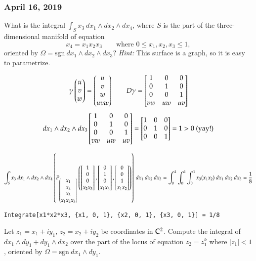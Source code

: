\subsubsection*{April 16, 2019}

What is the integral $\int_S x_3\ dx_1\land dx_2\land dx_4$, where $S$ is the part of the three-dimensional manifold of equation
\[x_4 = x_1x_2x_3\qquad \text{where }0\leq x_1, x_2, x_3\leq 1,\]
oriented by $\Omega = \mathrm{sgn}\ dx_1\land dx_2\land dx_3$? \emph{Hint: }This surface is a graph, so it is easy to parametrize. 

\[\gamma\begin{pmatrix} u \\ v \\ w \end{pmatrix} = \begin{pmatrix} u \\ v \\ w \\ uvw \end{pmatrix}\qquad D\gamma = \begin{bmatrix} 1 & 0 & 0 \\ 0 & 1 & 0 \\ 0 & 0 & 1 \\ vw & uw & uv \end{bmatrix}\]
\[dx_1\land dx_2\land dx_3 \begin{bmatrix} 1 & 0 & 0 \\ 0 & 1 & 0 \\ 0 & 0 & 1 \\ vw & uw & uv \end{bmatrix} = \begin{bmatrix} 1 & 0 & 0 \\ 0 & 1 & 0 \\ 0 & 0 & 1 \end{bmatrix} = 1>0 \text{ (yay!)}\]

\[\int_S x_3\ dx_1\land dx_2\land dx_4\left(P_{\begin{pmatrix} x_1 \\ x_2 \\ x_3 \\ x_1x_2x_3 \end{pmatrix}}\left(\begin{bmatrix} 1 \\ 0 \\ 0 \\ x_2x_3 \end{bmatrix},\begin{bmatrix} 0 \\ 1 \\ 0 \\ x_1x_3 \end{bmatrix}, \begin{bmatrix} 0 \\ 0 \\ 1 \\ x_1x_2 \end{bmatrix}\right)\right)\ dx_1\ dx_2\ dx_3 = \int_0^1 \int_0^1 \int_0^1 x_3 (x_1x_2)\ dx_1\ dx_2\ dx_3=\frac{1}{8}\]

\texttt{Integrate[x1*x2*x3, \{x1, 0, 1\}, \{x2, 0, 1\}, \{x3, 0, 1\}] = 1/8}

 Let $z_1=x_1+iy_1$, $z_2=x_2+iy_2$ be coordinates in $\mathbb{C}^2$. Compute the integral of $dx_1\land dy_1 + dy_1\land dx_2$ over the part of the locus of equation $z_2=z_1^k$ where $|z_1|<1$, oriented by $\Omega=\mathrm{sgn}\ dx_1 \land dy_1$. 

